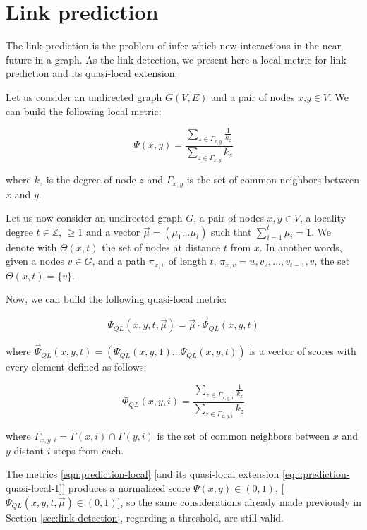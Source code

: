 \section{Link prediction}
\label{sec:link-prediction}

The link prediction is the problem of infer which new interactions in the near future in a graph.
As the link detection, we present here a local metric for link prediction and its quasi-local extension.

Let us consider an undirected graph $G(V,E)$ and a pair of nodes $x$,$y\in V$. We can build the following local metric:

\begin{equation}
\label{eqn:prediction-local}
\Psi(x,y)=
\frac{\sum\limits_{z\in\Gamma_{x,y}}\frac{1}{k_{z}}}
{\sum\limits_{z\in\Gamma_{x,y}}k_{z}}
\end{equation}

where $k_{z}$ is the degree of node $z$ and $\Gamma_{x,y}$ is the set of common neighbors between $x$ and $y$. 

Let us now consider an undirected graph $G$, a pair of nodes $x,y\in V$, a locality degree $t\in \mathbb{Z}$, $\geq 1$ and a vector $\vec{\mu}=(\mu_{1}\ldots\mu_{t})$ such that $\sum_{i=1}^{t}\mu_{i}=1$. We denote with $\Theta(x,t)$ the set of nodes at distance $t$ from $x$. In another words, given a nodes $v \in G$, and a path $\pi_{x,v}$ of length $t$, $\pi_{x,v} = u,v_{2},...,v_{t-1},v$, the set $\Theta(x,t) = \{v\}$.

Now, we can build the following quasi-local metric:

\begin{equation}
\label{eqn:prediction-quasi-local-1}
\Psi_{QL}(x,y,t,\vec{\mu})=\vec{\mu}\cdot\vec{\Psi}_{QL}(x,y,t)
\end{equation}


where $\vec{\Psi}_{QL}(x,y,t)=(\Psi_{QL}(x,y,1)\ldots\Psi_{QL}(x,y,t))$ is a vector of scores with every element defined as follows:

\begin{equation}
\label{eqn:prediction-quasi-local-2}
\Phi_{QL}(x,y,i)=
\frac{\sum\limits_{z\in \Gamma_{x,y,i}}\frac{1}{k_{z}}}
{\sum\limits_{z\in\Gamma_{x,y,i}}k_{z}}
\end{equation}

where $\Gamma_{x,y,i} = \Gamma(x,i) \cap \Gamma(y,i)$ is the set of common neighbors between $x$ and $y$ distant $i$ steps from each.

The metrics \ref{eqn:prediction-local} [and its quasi-local extension \ref{eqn:prediction-quasi-local-1}] produces a normalized score $\Psi(x,y) \in (0,1)$, [$\Psi_{QL}(x,y,t,\vec{\mu}) \in (0,1)$], so the same considerations already made previously in Section \ref{sec:link-detection}, regarding a threshold, are still valid. 